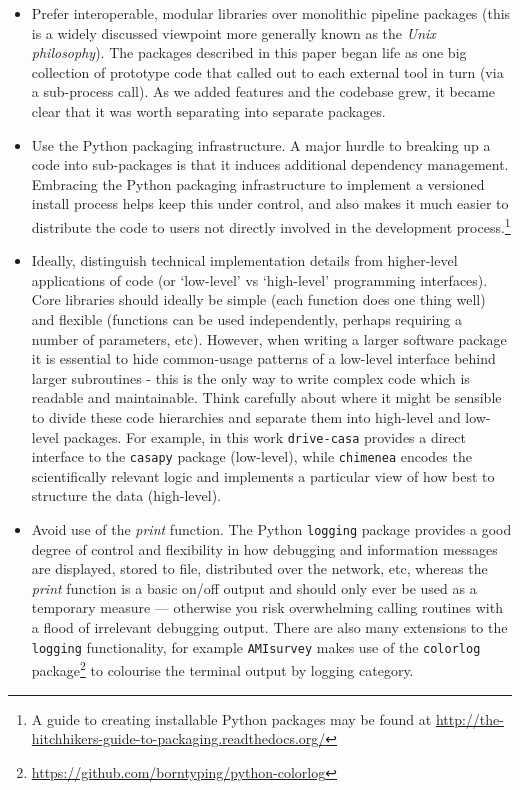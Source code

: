 \documentclass[5p,authoryear]{elsarticle}
\begin{document}
\begin{itemize}
 \item Prefer interoperable, modular libraries over monolithic pipeline packages 
  (this is a widely discussed viewpoint more generally known as the \textit{Unix philosophy}). 
  The packages described in this paper began life as one big collection of prototype code that called out to each external tool in turn (via a sub-process call).
  As we added features and the codebase grew, it became clear that it was worth separating into separate packages.
  
 \item Use the Python packaging infrastructure. 
  A major hurdle to breaking up a code into sub-packages is that it induces additional dependency management.
  Embracing the Python packaging infrastructure to implement a versioned install process helps keep this under control, and also makes it much easier to distribute the code to users not directly involved in the development 
  process.\footnote{A guide to creating installable Python packages may be found at \href{http://the-hitchhikers-guide-to-packaging.readthedocs.org/}{\url{http://the-hitchhikers-guide-to-packaging.readthedocs.org/}}}

 \item Ideally, distinguish technical implementation details from higher-level applications of code (or `low-level' vs `high-level' programming interfaces). 
    Core libraries should ideally be simple (each function does one thing well) and flexible (functions can be used independently, perhaps requiring a number of parameters, etc).
  However, when writing a larger software package it is essential to hide common-usage patterns of a low-level interface behind larger subroutines - this is the only way to write complex code which is readable and maintainable. 
   Think carefully about where it might be sensible to divide these code hierarchies and separate them into high-level and low-level packages. For example, in this work \texttt{drive-casa} provides a direct interface to the \texttt{casapy} package (low-level), while \texttt{chimenea} encodes the scientifically relevant logic and implements a particular view of how best to structure the data (high-level).

 \item Avoid use of the \textit{print} function. 
    The Python \texttt{logging} package provides a good degree of control and flexibility in how debugging and information messages are displayed, stored to file, distributed over the network, etc, whereas the \textit{print} function is a basic on/off output and should only ever be used as a temporary measure --- otherwise you risk overwhelming calling routines with a flood of irrelevant debugging output.
    There are also many extensions to the \texttt{logging} functionality, for example \texttt{AMIsurvey} makes use of the 
  \texttt{colorlog} package\footnote{\href{https://github.com/borntyping/python-colorlog}{\url{https://github.com/borntyping/python-colorlog}}} 
to colourise the terminal output by logging category.


\end{itemize}
\end{document}
